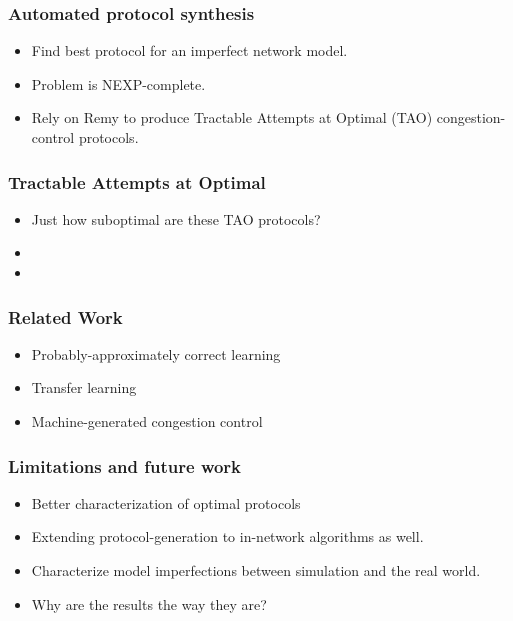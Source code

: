 \documentclass[svgnames]{beamer}
\begin{document}
\begin{Large}
\begin{frame}
\frametitle{Automated protocol synthesis}
\begin{itemize}
\item Find best protocol for an imperfect network model.
\item Problem is NEXP-complete. 
\item Rely on Remy to produce Tractable Attempts at Optimal (TAO) congestion-control protocols.
\end{itemize}
\end{frame}

\begin{frame}
\frametitle{Tractable Attempts at Optimal}
\begin{itemize}
\item Just how suboptimal are these TAO protocols?
\item  
\item
\end{itemize}
\end{frame}











\begin{frame}
\frametitle{Related Work}
\begin{itemize}
\item Probably-approximately correct learning
\item Transfer learning
\item Machine-generated congestion control
\end{itemize}
\end{frame}

\begin{frame}
\frametitle{Limitations and future work}
\begin{itemize}
\item Better characterization of optimal protocols
\item Extending protocol-generation to in-network algorithms as well.
\item Characterize model imperfections between simulation and the real world.
\item Why are the results the way they are?
\end{itemize}
\end{frame}
\end{Large}
\end{document}
